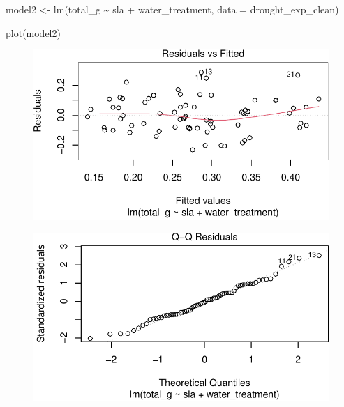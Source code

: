 \documentclass[
  letterpaper,
  DIV=11,
  numbers=noendperiod]{scrartcl}
\newenvironment{Shaded}{\begin{snugshade}}{\end{snugshade}}
\newcommand{\AttributeTok}[1]{\textcolor[rgb]{0.40,0.45,0.13}{#1}}
\newcommand{\FunctionTok}[1]{\textcolor[rgb]{0.28,0.35,0.67}{#1}}
\newcommand{\NormalTok}[1]{\textcolor[rgb]{0.00,0.23,0.31}{#1}}
\newcommand{\OtherTok}[1]{\textcolor[rgb]{0.00,0.23,0.31}{#1}}
\newcommand{\SpecialCharTok}[1]{\textcolor[rgb]{0.37,0.37,0.37}{#1}}
\begin{document}
\begin{Shaded}
\begin{Highlighting}[]
\NormalTok{model2 }\OtherTok{\textless{}{-}} \FunctionTok{lm}\NormalTok{(total\_g }\SpecialCharTok{\textasciitilde{}}\NormalTok{ sla }\SpecialCharTok{+}\NormalTok{ water\_treatment,}
             \AttributeTok{data =}\NormalTok{ drought\_exp\_clean)}

\FunctionTok{plot}\NormalTok{(model2)}
\end{Highlighting}
\end{Shaded}

\begin{figure}[H]

{\centering \includegraphics{Odile_Gabbiani_homework-03_files/figure-pdf/unnamed-chunk-9-1.pdf}

}

\end{figure}

\begin{figure}[H]

{\centering \includegraphics{Odile_Gabbiani_homework-03_files/figure-pdf/unnamed-chunk-9-2.pdf}

}

\end{figure}
\end{document}
